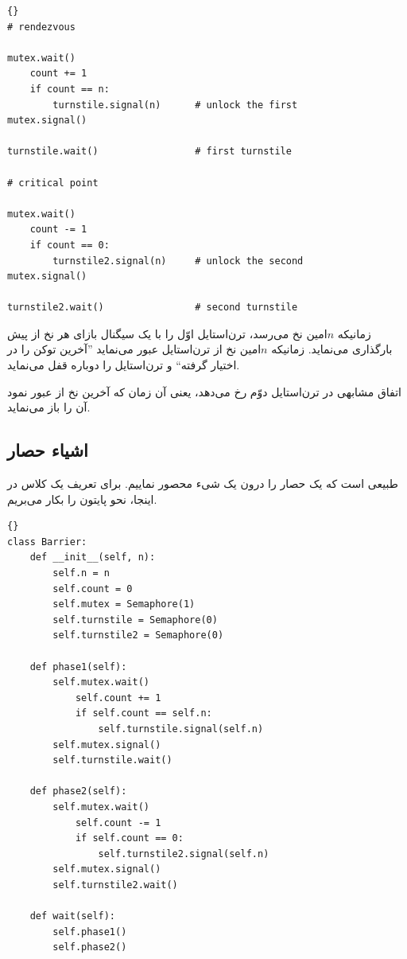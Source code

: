 \documentclass{book}
\begin{document}
\begin{latin}
\begin{lstlisting}[title=\rl{راه‌حل حصار با قابلیت استفادهٔ مجدد}]{}
# rendezvous

mutex.wait()
    count += 1
    if count == n:
        turnstile.signal(n)      # unlock the first
mutex.signal()

turnstile.wait()                 # first turnstile

# critical point

mutex.wait()
    count -= 1
    if count == 0:
        turnstile2.signal(n)     # unlock the second
mutex.signal()

turnstile2.wait()                # second turnstile
\end{lstlisting}
\end{latin}

    زمانیکه $n$امین نخ می‌رسد، ترن‌استایل اوّل را با یک سیگنال بازای هر نخ از پیش بارگذاری می‌نماید.
    زمانیکه $n$امین نخ از ترن‌استایل عبور می‌نماید ''آخرین توکن را در اختیار گرفته`` و ترن‌استایل را دوباره قفل می‌نماید. 
    

    اتفاق مشابهی در ترن‌استایل دوّم  رخ می‌دهد،  یعنی آن زمان که آخرین نخ از  عبور نمود آن را باز می‌نماید. 

\newpage
\subsection {اشیاء حصار}

    طبیعی است که یک حصار را درون یک شیء محصور نماییم. 
    برای تعریف یک کلاس در اینجا، نحو پایتون را بکار می‌بریم. 

\begin{latin}
\begin{lstlisting}[title=\rl{کلاس \lr{Barrier} }]{}
class Barrier:
    def __init__(self, n):
        self.n = n
        self.count = 0
        self.mutex = Semaphore(1)
        self.turnstile = Semaphore(0)
        self.turnstile2 = Semaphore(0)

    def phase1(self):
        self.mutex.wait()
            self.count += 1
            if self.count == self.n:
                self.turnstile.signal(self.n) 
        self.mutex.signal()
        self.turnstile.wait()            

    def phase2(self):
        self.mutex.wait()
            self.count -= 1
            if self.count == 0:
                self.turnstile2.signal(self.n)
        self.mutex.signal()
        self.turnstile2.wait()

    def wait(self):
        self.phase1()
        self.phase2()
\end{lstlisting}
\end{latin}
\end{document}
